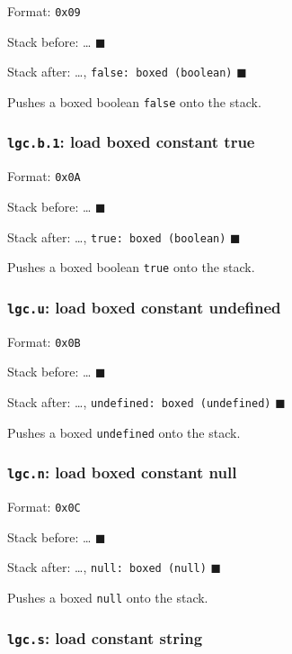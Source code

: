 Format: \texttt{0x09}

Stack before: \ldots{} \(\blacksquare\)

Stack after: \ldots, \texttt{false:\ boxed\ (boolean)} \(\blacksquare\)

Pushes a boxed boolean \texttt{false} onto the stack.

\subsubsection{\texorpdfstring{\texttt{lgc.b.1}: load boxed constant
true}{lgc.b.1: load boxed constant true}}

Format: \texttt{0x0A}

Stack before: \ldots{} \(\blacksquare\)

Stack after: \ldots, \texttt{true:\ boxed\ (boolean)} \(\blacksquare\)

Pushes a boxed boolean \texttt{true} onto the stack.

\subsubsection{\texorpdfstring{\texttt{lgc.u}: load boxed constant
undefined}{lgc.u: load boxed constant undefined}}

Format: \texttt{0x0B}

Stack before: \ldots{} \(\blacksquare\)

Stack after: \ldots, \texttt{undefined:\ boxed\ (undefined)}
\(\blacksquare\)

Pushes a boxed \texttt{undefined} onto the stack.

\subsubsection{\texorpdfstring{\texttt{lgc.n}: load boxed constant
null}{lgc.n: load boxed constant null}}

Format: \texttt{0x0C}

Stack before: \ldots{} \(\blacksquare\)

Stack after: \ldots, \texttt{null:\ boxed\ (null)} \(\blacksquare\)

Pushes a boxed \texttt{null} onto the stack.

\subsubsection{\texorpdfstring{\texttt{lgc.s}: load constant
string}{lgc.s: load constant string}}

